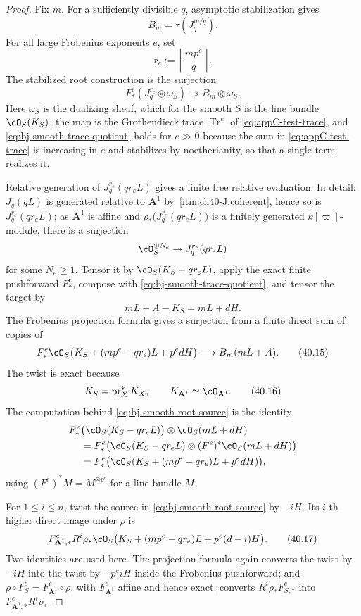 \begin{proof}
Fix $m$.  For a sufficiently divisible $q$, asymptotic stabilization
gives
\[
                         B_m=\tau(J_q^{m/q}).
\]
For all large Frobenius exponents $e$, set
\[
                         r_e:=\left\lceil\frac{mp^e}{q}\right\rceil.
\]
The stabilized root construction is the surjection
\[
 F_*^e(J_q^{r_e}\otimes\omega_S)
       \twoheadrightarrow B_m\otimes\omega_S.
\tag{40.14}\label{eq:bj-smooth-trace-quotient}
\]
Here $\omega_S$ is the dualizing sheaf, which for the smooth $S$ is the
line bundle $\cO_S(K_S)$; the map is the Grothendieck trace
$\operatorname{Tr}^e$ of \eqref{eq:appC-test-trace}, and
\eqref{eq:bj-smooth-trace-quotient} holds for $e\gg0$ because the sum in
\eqref{eq:appC-test-trace} is increasing in $e$ and stabilizes by
noetherianity, so that a single term realizes it.

Relative generation of $J_q^{r_e}(qr_eL)$ gives a finite free relative
evaluation.  In detail: $J_q(qL)$ is generated relative to
$\mathbf A^1$ by \,\cref{itm:ch40-J:coherent}, hence
so is $J_q^{r_e}(qr_eL)$; as $\mathbf A^1$ is affine and
$\rho_*\bigl(J_q^{r_e}(qr_eL)\bigr)$ is a finitely generated
$k[\varpi]$-module, there is a surjection
\[
 \cO_S^{\oplus N_e}\twoheadrightarrow J_q^{r_e}(qr_eL)
\]
for some $N_e\ge1$.
Tensor it by $\cO_S(K_S-qr_eL)$, apply the exact finite
pushforward $F_*^e$, compose with
\eqref{eq:bj-smooth-trace-quotient}, and tensor the target by
\[
                         mL+A-K_S=mL+dH.
\]
The Frobenius projection formula gives a surjection from a finite direct sum
of copies of
\[
 F_*^e\cO_S\bigl(
 K_S+(mp^e-qr_e)L+p^edH
 \bigr)
 \longrightarrow B_m(mL+A).
\tag{40.15}\label{eq:bj-smooth-root-source}
\]
The twist is exact because
\[
 K_S=\operatorname{pr}_X^*K_X,\qquad
 K_{\mathbf A^1}\simeq\cO_{\mathbf A^1}.
\tag{40.16}\label{eq:bj-smooth-canonical-product}
\]
The computation behind \eqref{eq:bj-smooth-root-source} is the identity
\[
 \begin{aligned}
 F^e_*&\bigl(\cO_S(K_S-qr_eL)\bigr)\otimes\cO_S(mL+dH)\\
 &=F^e_*\bigl(\cO_S(K_S-qr_eL)\otimes(F^e)^*\cO_S(mL+dH)\bigr)\\
 &=F^e_*\bigl(\cO_S(K_S+(mp^e-qr_e)L+p^edH)\bigr),
 \end{aligned}
\]
using $(F^e)^*M=M^{\otimes p^e}$ for a line bundle $M$.

For $1\le i\le n$, twist the source in
\eqref{eq:bj-smooth-root-source} by $-iH$.  Its $i$-th higher direct
image under $\rho$ is
\[
 F_{\mathbf A^1,*}^eR^i\rho_*
 \cO_S\bigl(
 K_S+(mp^e-qr_e)L+p^e(d-i)H
 \bigr).
\tag{40.17}\label{eq:bj-smooth-root-cohomology}
\]
Two identities are used here.  The projection formula again converts the
twist by $-iH$ into the twist by $-p^eiH$ inside the Frobenius
pushforward; and $\rho\circ F_S^e=F_{\mathbf A^1}^e\circ\rho$, with
$F^e_{\mathbf A^1}$ affine and hence exact, converts
$R^i\rho_*F^e_{S,*}$ into $F^e_{\mathbf A^1,*}R^i\rho_*$.


\end{proof}
